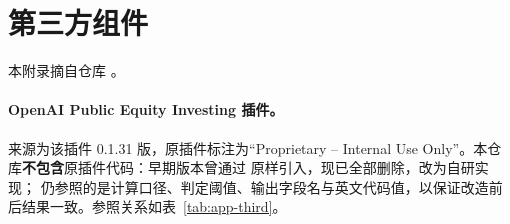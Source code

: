 \section{第三方组件}
\label{app:thirdparty}

本附录摘自仓库 。

\paragraph{OpenAI Public Equity Investing 插件。}
来源为该插件 0.1.31 版，原插件标注为“Proprietary – Internal Use Only”。本仓库\textbf{不包含}原插件代码：早期版本曾通过  原样引入，现已全部删除，改为自研实现；
仍参照的是计算口径、判定阈值、输出字段名与英文代码值，以保证改造前后结果一致。参照关系如表~\ref{tab:app-third}。

